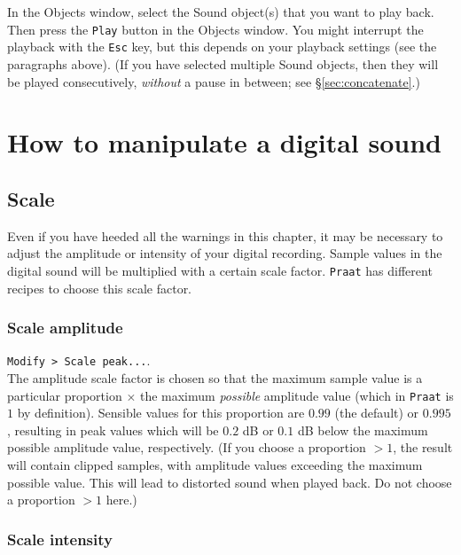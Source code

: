 \documentclass[
]{book}
\begin{document}
\label{box-praatplay}
In the Objects window, select the Sound object(s) that you want to play back. Then press the \texttt{Play} button in the Objects window. You might interrupt the playback with the \texttt{Esc} key, but this depends on your playback settings (see the paragraphs above). (If you have selected multiple Sound objects, then they will be played consecutively, \emph{without} a pause in between; see §\ref{sec:concatenate}.)

\section{How to manipulate a digital sound}\label{how-to-manipulate-a-digital-sound}

\subsection{Scale}\label{scale}

Even if you have heeded all the warnings in this chapter, it may be necessary to adjust the amplitude or intensity of your digital recording. Sample values in the digital sound will be multiplied with a certain scale factor. \texttt{Praat} has different recipes to choose this scale factor.

\label{box-praatscale}
\subsubsection{Scale amplitude}\label{scale-amplitude}

\texttt{Modify\ \textgreater{}\ Scale\ peak...}.\\
The amplitude scale factor is chosen so that the maximum sample value is a particular proportion \(\times\) the maximum \emph{possible} amplitude value (which in \texttt{Praat} is \(1\) by definition). Sensible values for this proportion are \(0.99\) (the default) or \(0.995\), resulting in peak values which will be \(0.2\) dB or \(0.1\) dB below the maximum possible amplitude value, respectively. (If you choose a proportion \(>1\), the result will contain clipped samples, with amplitude values exceeding the maximum possible value. This will lead to distorted sound when played back. Do not choose a proportion \(>1\) here.)

\subsubsection{Scale intensity}\label{scale-intensity}
\end{document}
